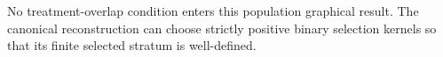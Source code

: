 No treatment-overlap condition enters this population graphical result.  The canonical reconstruction can choose strictly positive binary selection kernels so that its finite selected stratum is well-defined.